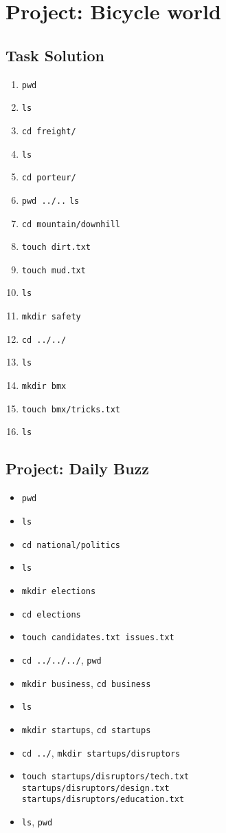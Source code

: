 \documentclass[12pt]{article}
\begin{document}
\section{Project: Bicycle world}
\subsection{Task Solution}
\begin{enumerate}[1.]
    \item \texttt{pwd}
    \item \texttt{ls}
    \item \texttt{cd freight/}
    \item \texttt{ls}
    \item \texttt{cd porteur/}
    \item \texttt{pwd ../..} \texttt{ls}
    \item \texttt{cd mountain/downhill}
    \item \texttt{touch dirt.txt}
    \item \texttt{touch mud.txt}
    \item \texttt{ls}
    \item \texttt{mkdir safety}
    \item \texttt{cd ../../}
    \item \texttt{ls}
    \item \texttt{mkdir bmx}
    \item \texttt{touch bmx/tricks.txt}
    \item \texttt{ls}
\end{enumerate}

\bigskip

\subsection{Project: Daily Buzz}
\begin{itemize}
    \item \texttt{pwd}
    \item \texttt{ls}
    \item \texttt{cd national/politics}
    \item \texttt{ls}
    \item \texttt{mkdir elections}
    \item \texttt{cd elections}
    \item \texttt{touch candidates.txt issues.txt}
    \item \texttt{cd ../../../}, \texttt{pwd}
    \item \texttt{mkdir business}, \texttt{cd business}
    \item \texttt{ls}
    \item \texttt{mkdir startups}, \texttt{cd startups}
    \item \texttt{cd ../}, \texttt{mkdir startups/disruptors}
    \item \texttt{touch startups/disruptors/tech.txt\\ startups/disruptors/design.txt\\ startups/disruptors/education.txt}
    \item \texttt{ls}, \texttt{pwd}
\end{itemize}
\end{document}
